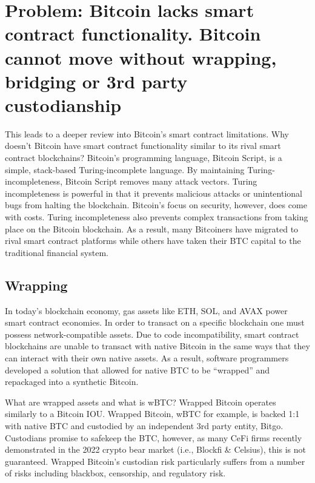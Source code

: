 \documentclass[twoside, a4paper, 11pt]{article}
\begin{document}
  \section{Problem: Bitcoin lacks smart contract functionality. Bitcoin cannot move without wrapping, bridging or 3rd party custodianship}

  This leads to a deeper review into Bitcoin’s smart contract limitations. Why doesn’t Bitcoin have smart contract functionality similar to its rival smart contract blockchains? Bitcoin’s programming language, Bitcoin Script, is a simple, stack-based Turing-incomplete language. By maintaining Turing-incompleteness, Bitcoin Script removes many attack vectors. Turing incompleteness is powerful in that it prevents malicious attacks or unintentional bugs from halting the blockchain. Bitcoin’s focus on security, however, does come with costs. Turing incompleteness also prevents complex transactions from taking place on the Bitcoin blockchain. As a result, many Bitcoiners have migrated to rival smart contract platforms while others have taken their BTC capital to the traditional financial system.

  \subsection{Wrapping}

  In today’s blockchain economy, gas assets like ETH, SOL, and AVAX power smart contract economies. In order to transact on a specific blockchain one must possess network-compatible assets. Due to code incompatibility, smart contract blockchains are unable to transact with native Bitcoin in the same ways that they can interact with their own native assets. As a result, software programmers developed a solution that allowed for native BTC to be “wrapped” and repackaged into a synthetic Bitcoin.

  What are wrapped assets and what is wBTC? Wrapped Bitcoin operates similarly to a Bitcoin IOU. Wrapped Bitcoin, wBTC for example, is backed 1:1 with native BTC and custodied by an independent 3rd party entity, Bitgo. Custodians promise to safekeep the BTC, however, as many CeFi firms recently demonstrated in the 2022 crypto bear market (i.e., Blockfi \& Celsius), this is not guaranteed. Wrapped Bitcoin’s custodian risk particularly suffers from a number of risks including blackbox, censorship, and regulatory risk.
\end{document}
